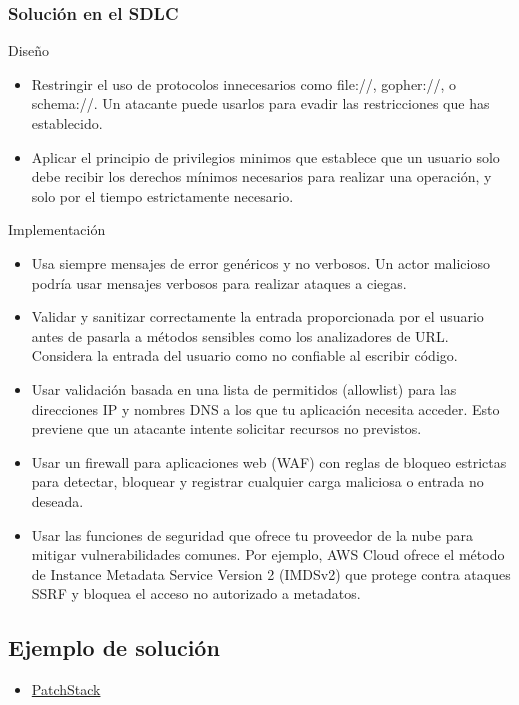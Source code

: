 \subsubsection{Solución en el SDLC}
Diseño
\begin{itemize}
    \item Restringir el uso de protocolos innecesarios como file://, gopher://, o schema://. Un atacante puede usarlos para evadir las restricciones que has establecido.
    \item Aplicar el principio de privilegios minimos que establece que un usuario solo debe recibir los derechos mínimos necesarios para realizar una operación, y solo por el tiempo estrictamente necesario.

\end{itemize}
Implementación
\begin{itemize}
    \item Usa siempre mensajes de error genéricos y no verbosos. Un actor malicioso podría usar mensajes verbosos para realizar ataques a ciegas.
    \item Validar y sanitizar correctamente la entrada proporcionada por el usuario antes de pasarla a métodos sensibles como los analizadores de URL. Considera la entrada del usuario como no confiable al escribir código.
    \item Usar validación basada en una lista de permitidos (allowlist) para las direcciones IP y nombres DNS a los que tu aplicación necesita acceder. Esto previene que un atacante intente solicitar recursos no previstos.
    \item Usar un firewall para aplicaciones web (WAF) con reglas de bloqueo estrictas para detectar, bloquear y registrar cualquier carga maliciosa o entrada no deseada.
    \item Usar las funciones de seguridad que ofrece tu proveedor de la nube para mitigar vulnerabilidades comunes. Por ejemplo, AWS Cloud ofrece el método de Instance Metadata Service Version 2 (IMDSv2) que protege contra ataques SSRF y bloquea el acceso no autorizado a metadatos.
    
\end{itemize}
\subsection{Ejemplo de solución}

\begin{itemize}
    \item \href{https://patchstack.com/academy/wordpress/securing-code/server-side-request-forgery/}{PatchStack}
\end{itemize}

